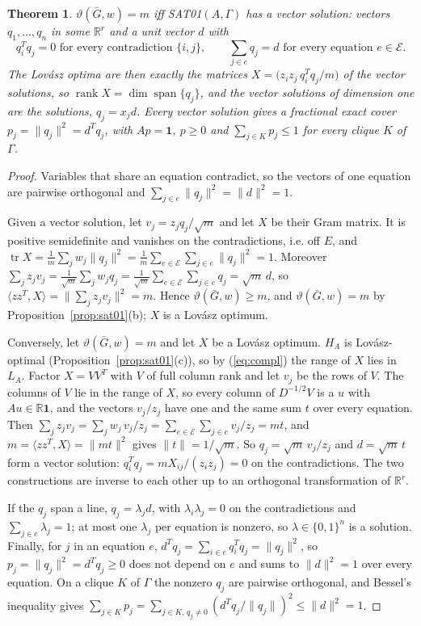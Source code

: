 \documentclass[11pt]{article}
\newtheorem{thm}{Theorem}[section]
\theoremstyle{definition}
\theoremstyle{remark}
\newcommand{\R}{\mathbb{R}}
\newcommand{\one}{\mathbf{1}}
\newcommand{\vt}{\vartheta(\bar G,w)}
\DeclareMathOperator{\tr}{tr}
\DeclareMathOperator{\spn}{span}
\DeclareMathOperator{\rank}{rank}
\begin{document}
\begin{thm}
\label{thm:vector}
$\vt=m$ iff SAT01$(A,\Gamma)$ has a {\em vector solution}: vectors
$q_1,\ldots,q_n$ in some $\R^r$ and a unit vector $d$ with
\[ q_i^Tq_j=0 \mbox{ for every contradiction } \{i,j\}, \qquad
   \sum_{j\in e}q_j=d \mbox{ for every equation } e\in\mathcal E. \]
The Lov\'asz optima are then exactly the matrices
$X=\bigl(z_iz_j\,q_i^Tq_j/m\bigr)$ of the vector solutions, so
$\rank X=\dim\spn\{q_j\}$, and the vector solutions of dimension one are the
solutions, $q_j=x_jd$. Every vector solution gives a fractional exact cover
$p_j=\|q_j\|^2=d^Tq_j$, with $Ap=\one$, $p\geq0$ and $\sum_{j\in K}p_j\leq1$
for every clique $K$ of $\Gamma$.
\end{thm}
\begin{proof}
Variables that share an equation contradict, so the vectors of one equation
are pairwise orthogonal and $\sum_{j\in e}\|q_j\|^2=\|d\|^2=1$.

Given a vector solution, let $v_j=z_jq_j/\sqrt m$ and let $X$ be their Gram
matrix. It is positive semidefinite and vanishes on the contradictions, i.e.
off $E$, and
$\tr X=\frac1m\sum_jw_j\|q_j\|^2=\frac1m\sum_{e\in\mathcal E}\sum_{j\in e}
\|q_j\|^2=1$. Moreover
$\sum_jz_jv_j=\frac1{\sqrt m}\sum_jw_jq_j=\frac1{\sqrt
m}\sum_{e\in\mathcal E}\sum_{j\in e}q_j=\sqrt m\,d$, so
$\langle zz^T,X\rangle=\|\sum_jz_jv_j\|^2=m$. Hence $\vt\geq m$, and $\vt=m$
by Proposition~\ref{prop:sat01}(b); $X$ is a Lov\'asz optimum.

Conversely, let $\vt=m$ and let $X$ be a Lov\'asz optimum. $H_A$ is
Lov\'asz-optimal (Proposition~\ref{prop:sat01}(c)), so by (\ref{eq:compl})
the range of $X$ lies in $L_A$. Factor $X=VV^T$ with $V$ of full column rank
and let $v_j$ be the rows of $V$. The columns of $V$ lie in the range of $X$,
so every column of $D^{-1/2}V$ is a $u$ with $Au\in\R\one$, and the vectors
$v_j/z_j$ have one and the same sum $t$ over every equation. Then
$\sum_jz_jv_j=\sum_jw_j\,v_j/z_j=\sum_{e\in\mathcal E}\sum_{j\in e}v_j/z_j
=mt$, and $m=\langle zz^T,X\rangle=\|mt\|^2$ gives $\|t\|=1/\sqrt m$. So
$q_j=\sqrt m\,v_j/z_j$ and $d=\sqrt m\,t$ form a vector solution:
$q_i^Tq_j=mX_{ij}/(z_iz_j)=0$ on the contradictions. The two constructions
are inverse to each other up to an orthogonal transformation of $\R^r$.

If the $q_j$ span a line, $q_j=\lambda_jd$, with $\lambda_i\lambda_j=0$ on the
contradictions and $\sum_{j\in e}\lambda_j=1$; at most one $\lambda_j$ per
equation is nonzero, so $\lambda\in\{0,1\}^n$ is a solution. Finally, for
$j$ in an equation $e$, $d^Tq_j=\sum_{i\in e}q_i^Tq_j=\|q_j\|^2$, so
$p_j=\|q_j\|^2=d^Tq_j\geq0$ does not depend on $e$ and sums to $\|d\|^2=1$
over every equation. On a clique $K$ of $\Gamma$ the nonzero $q_j$ are
pairwise orthogonal, and Bessel's inequality gives
$\sum_{j\in K}p_j=\sum_{j\in K,\,q_j\neq0}(d^Tq_j/\|q_j\|)^2\leq\|d\|^2=1$.
\end{proof}
\end{document}
